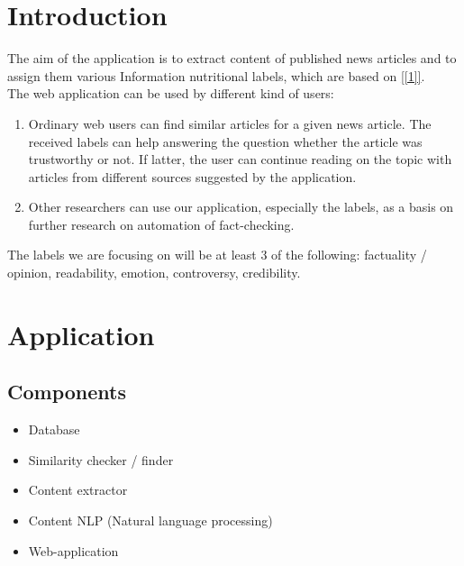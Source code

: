 \documentclass[10pt]{article}
\begin{document}
\begin{multicols}{2}


\section{Introduction}
The aim of the application is to extract content of published news articles and to assign them various \grqq{} Information nutritional labels\grqq{}, which are based on \ref{[1]}.\\
The web application can be used by different kind of users:
\begin{enumerate}
\item Ordinary web users can find similar articles for a given news article. The received labels can help answering the question whether the article was trustworthy or not. If latter, the user can continue reading on the topic with articles from different sources suggested by the application.
\item Other researchers can use our application, especially the labels, as a basis on further research on automation of fact-checking.
\end{enumerate}
The labels we are focusing on will be at least 3 of the following: factuality / opinion, readability, emotion, controversy, credibility.


\section{Application}
\subsection{Components}
\begin{itemize}
\item Database
\item Similarity checker / finder
\item Content extractor
\item Content NLP (Natural language processing)
\item Web-application
\end{itemize}

\end{multicols}
\end{document}
